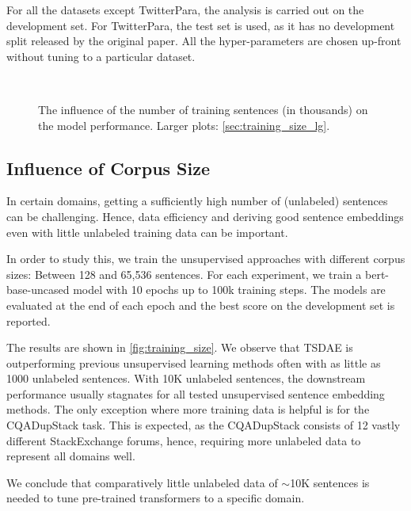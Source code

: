 \documentclass[11pt]{article}
\begin{document}
For all the datasets except TwitterPara, the analysis is carried out on the development set. For TwitterPara, the test set is used, as it has no development split released by the original paper. All the hyper-parameters are chosen up-front without tuning to a particular dataset.


\begin{figure}[t]
  \centering
   \\
  \caption{The influence of the number of training sentences (in thousands) on the model performance. Larger plots: \autoref{sec:training_size_lg}.}
  \label{fig:training_size}
\end{figure}

\subsection{Influence of Corpus Size} 
In certain domains, getting a sufficiently high number of (unlabeled) sentences can be challenging. Hence, data efficiency and deriving good sentence embeddings even with little unlabeled training data can be important. 

In order to study this, we train the unsupervised approaches with different corpus sizes: Between 128 and 65,536 sentences. For each experiment, we train a bert-base-uncased model with 10 epochs up to 100k training steps. The models are evaluated at the end of each epoch and the best score on the development set is reported. 

The results are shown in \autoref{fig:training_size}. We observe that TSDAE is outperforming previous unsupervised learning methods often with as little as 1000 unlabeled sentences. With 10K unlabeled sentences, the downstream performance usually stagnates for all tested unsupervised sentence embedding methods. The only exception where more training data is helpful is for the CQADupStack task. This is expected, as the CQADupStack consists of 12 vastly different StackExchange forums, hence, requiring more unlabeled data to represent all domains well.

We conclude that comparatively little unlabeled data of $\sim$10K sentences is needed to tune pre-trained transformers to a specific domain.
\end{document}

